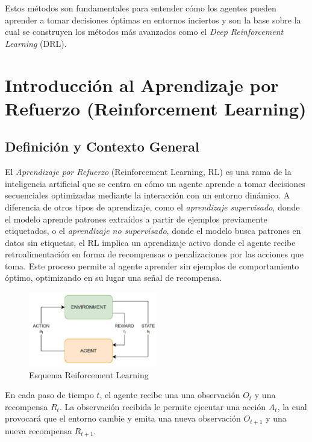 \documentclass[a4paper,12pt]{report}
\begin{document}
Estos métodos son fundamentales para entender cómo los agentes pueden aprender a tomar decisiones 
óptimas en entornos inciertos y son la base sobre la cual se construyen los métodos más avanzados 
como el \textit{Deep Reinforcement Learning} (DRL).


\section{Introducción al Aprendizaje por Refuerzo (Reinforcement Learning)}

\subsection{Definición y Contexto General}

El \textit{Aprendizaje por Refuerzo} (Reinforcement Learning, RL) es una rama de la inteligencia 
artificial que se centra en cómo un agente aprende a tomar decisiones secuenciales optimizadas 
mediante la interacción con un entorno dinámico. A diferencia de otros tipos de aprendizaje, como 
el \textit{aprendizaje supervisado}, donde el modelo aprende patrones extraídos a partir de ejemplos 
previamente etiquetados, o el \textit{aprendizaje no supervisado}, donde el modelo busca patrones 
en datos sin etiquetas, el RL implica un aprendizaje activo donde el agente recibe retroalimentación 
en forma de recompensas o penalizaciones por las acciones que toma. Este proceso permite al 
agente aprender sin ejemplos de comportamiento óptimo, optimizando en su lugar una señal de recompensa.

\begin{figure}[H]
    \centering
    \includegraphics[width=0.5\textwidth]{./figures/Reinforcement-Learning-schema.png}
    \caption{Esquema Reiforcement Learning}
    \label{fig:RF-schema}
\end{figure}

En cada paso de tiempo \(t\), el agente recibe una una observación \(O_t\) y una recompensa \(R_t\).
La observación recibida le permite ejecutar una acción \(A_t\), la cual provocará que el entorno cambie
y emita una nueva observación \(O_{t+1}\) y una nueva recompensa \(R_{t+1}\).
\end{document}
